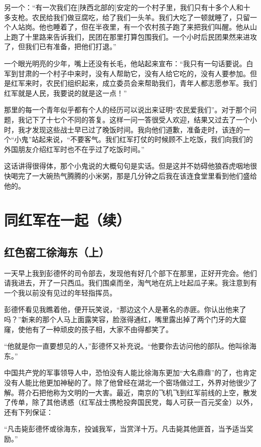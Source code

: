 \documentclass[10pt]{book}
\begin{document}
另一个：“有一次我们在[陕西北部的]安定的一个村子里，我们只有十多个人和十多支枪。农民给我们做豆腐吃，给了我们一头羊。我们大吃了一顿就睡了，只留一个人站岗。他也睡着了，但在半夜里，有一个农村孩子跑了来把我们叫醒。他从山上跑了十里路来告诉我们，民团在那里打算包围我们。一个小时后民团果然来进攻了，但我们已有准备，把他们打退。”

一个眼光明亮的少年，嘴上还没有长毛，他站起来宣布：“我只有一句话要说。白军到甘肃的一个村子中来时，没有人帮助它，没有人给它吃的，没有人要参加。但是红军来时，农民们组织起来，成立委员会来帮助我们，青年人都志愿参军。我们红军就是人民，我要说的就是这一点！”

那里的每一个青年似乎都有个人的经历可以说出来证明“农民爱我们”。对于那个问题，我记下了十七个不同的答复。这样一问一答很受人欢迎，结果又过去了一个小时，我才发现这些战士早已过了晚饭时间。我向他们道歉，准备走时，该连的一个“小鬼”站起来说，“不要客气。我们红军打仗的时候顾不上吃饭，我们向我们的外国朋友介绍红军时也不在乎过了吃饭时间。”

这话讲得很得体，那个小鬼说的大概句句是实话。但是这并不妨碍他狼吞虎咽地很快喝完了一大碗热气腾腾的小米粥，那是几分钟之后我在该连食堂里看到他们盛给他的。

\chapter{同红军在一起（续）}

\section{红色窑工徐海东（上）}

一天早上我到彭德怀的司令部去，发现他有好几个部下在那里，正好开完会。他们请我进去，开了一只西瓜。我们围桌而坐，淘气地在炕上吐起瓜子来。我注意到有一个我以前没有见过的年轻指挥员。

彭德怀看见我瞧着他，便开玩笑说，“那边这个人是著名的赤匪。你认出他来了吗？”新来的那个人马上面露笑容，脸涨得通红，嘴里露出掉了两个门牙的大窟窿，使他有了一种顽皮的孩子相，大家不由得都笑了。

“他就是你一直要想见的人，”彭德怀又补充说。“他要你去访问他的部队。他叫徐海东。”

中国共产党的军事领导人中，恐怕没有人能比徐海东更加“大名鼎鼎”的了，也肯定没有人能比他更加神秘的了。除了他曾经在湖北一个窑场做过工，外界对他很少了解。蒋介石把他称为文明的一大害。最近，南京的飞机飞到红军前线的上空，散发了传单，除了其他诱惑（红军战士携枪投奔国民党，每人可获一百元奖金）以外，还有下列保证：

“凡击毙彭德怀或徐海东，投诚我军，当赏洋十万。凡击毙其他匪首，当予适当奖励。”
\end{document}
